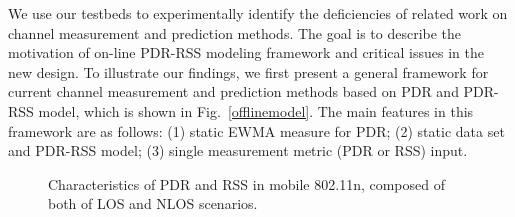 \documentclass[draftclsnofoot,journal,onecolumn,11pt]{IEEEtran}
\begin{document}
We use our testbeds to experimentally identify the deficiencies of related work on channel measurement and prediction methods. The goal is to describe the motivation of on-line PDR-RSS modeling framework and critical issues in the new design. To illustrate our findings, we first present a general framework for current channel measurement and prediction methods based on PDR and PDR-RSS model, which is shown in Fig.~\ref{offlinemodel}. The main features in this framework are as follows: (1) static EWMA measure for PDR; (2) static data set and PDR-RSS model; (3) single measurement metric (PDR or RSS) input.
\begin{figure}[!t]
\centerline{
}
\caption{Characteristics of PDR and RSS in mobile 802.11n, composed of both of LOS and NLOS scenarios.}
\label{time}
\end{figure}
\end{document}
